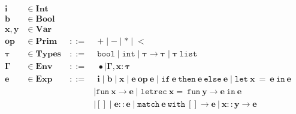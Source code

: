 \documentclass{article}
\begin{document}
\begin{alignat*}
    \boldsymbol{i} & \in \mathbf{Int} & &\\
    \boldsymbol{b} & \in \mathbf{Bool} & &\\
    \boldsymbol{x,y} & \in \mathbf{Var} & &\\
    \boldsymbol{op} & \in \mathbf{Prim} & ~ ::= & ~~ \boldsymbol{+} \mid \boldsymbol{-} \mid \boldsymbol{*} \mid \boldsymbol{<}\\
    \boldsymbol{\tau} & \in \mathbf{Types} & ~ ::= & ~~ \mathtt{bool} \mid \mathtt{int} \mid \boldsymbol{\tau} \to \boldsymbol{\tau} \mid \boldsymbol{\tau} ~ \mathtt{list}\\
    \boldsymbol{\Gamma} & \in \mathbf{Env} & ~ ::= & ~~ \bullet \mid \boldsymbol{\Gamma},\boldsymbol{x}:\boldsymbol{\tau}\\
    \boldsymbol{e} & \in \mathbf{Exp} & ~ ::= & ~~ \boldsymbol{i}
    \mid \boldsymbol{b}
    \mid \boldsymbol{x}
    \mid \boldsymbol{e ~ op ~ e}
    \mid \mathtt{if} ~ \boldsymbol{e} ~ \mathtt{then} ~ \boldsymbol{e} ~ \mathtt{else} ~ \boldsymbol{e}
    \mid \mathtt{let} ~ \boldsymbol{x ~ = ~ e} ~ \mathtt{in} ~ \boldsymbol{e}\\
    &&&\mid \mathtt{fun} ~ \boldsymbol{x} \to \boldsymbol{e}
    \mid \mathtt{let rec} ~ \boldsymbol{x =} ~ \mathtt{fun} ~ \boldsymbol{y} \to \boldsymbol{e} ~ \mathtt{in} ~ \boldsymbol{e}\\
    &&&\mid \boldsymbol{[]}
    \mid \boldsymbol{e} :: \boldsymbol{e}
    \mid \mathtt{match} ~ \boldsymbol{e} ~ \mathtt{with} ~ \boldsymbol{[]} \to \boldsymbol{e} ~ \boldsymbol{|} ~ \boldsymbol{x} :: \boldsymbol{y} \to \boldsymbol{e}
\end{alignat*}
\end{document}
